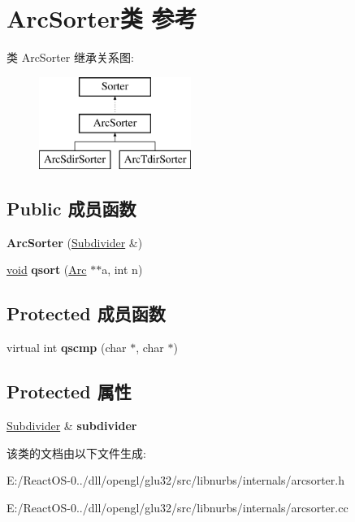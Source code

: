 \hypertarget{class_arc_sorter}{}\section{Arc\+Sorter类 参考}
\label{class_arc_sorter}
类 Arc\+Sorter 继承关系图\+:\begin{figure}[H]
\begin{center}
\leavevmode
\includegraphics[height=3.000000cm]{class_arc_sorter}
\end{center}
\end{figure}
\subsection*{Public 成员函数}
\begin{DoxyCompactItemize}
\item 
\mbox{\label{class_arc_sorter_add2bc61fec8ad5a90591436640b62f2c}} 
{\bfseries Arc\+Sorter} (\hyperlink{class_subdivider}{Subdivider} \&)
\item 
\mbox{\label{class_arc_sorter_aaf00d578012fd04ba3be321100eea0d0}} 
\hyperlink{interfacevoid}{void} {\bfseries qsort} (\hyperlink{class_arc}{Arc} $\ast$$\ast$a, int n)
\end{DoxyCompactItemize}
\subsection*{Protected 成员函数}
\begin{DoxyCompactItemize}
\item 
\mbox{\label{class_arc_sorter_a1b9cd76f98de0947031984e6fadbcc9e}} 
virtual int {\bfseries qscmp} (char $\ast$, char $\ast$)
\end{DoxyCompactItemize}
\subsection*{Protected 属性}
\begin{DoxyCompactItemize}
\item 
\mbox{\label{class_arc_sorter_a51813c037f3a3ef12befb867642e4c82}} 
\hyperlink{class_subdivider}{Subdivider} \& {\bfseries subdivider}
\end{DoxyCompactItemize}


该类的文档由以下文件生成\+:\begin{DoxyCompactItemize}
\item 
E\+:/\+React\+O\+S-\/0../dll/opengl/glu32/src/libnurbs/internals/arcsorter.\+h\item 
E\+:/\+React\+O\+S-\/0../dll/opengl/glu32/src/libnurbs/internals/arcsorter.\+cc\end{DoxyCompactItemize}
